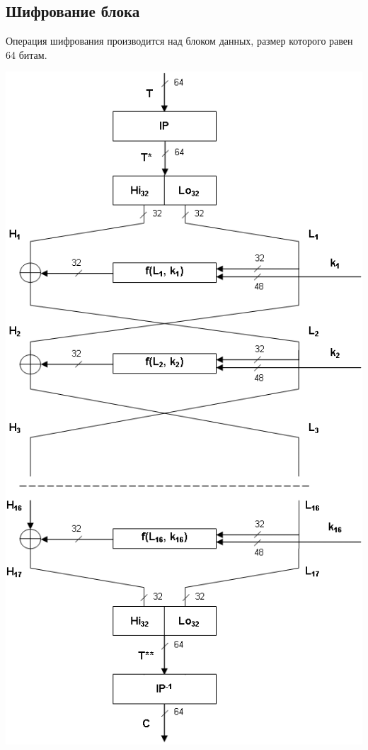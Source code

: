 \subsection{Шифрование блока}
Операция шифрования производится над блоком данных, размер которого равен 64 битам.
\begin{center}
\includegraphics[scale=0.5]{des_ECB}
\end{center}
